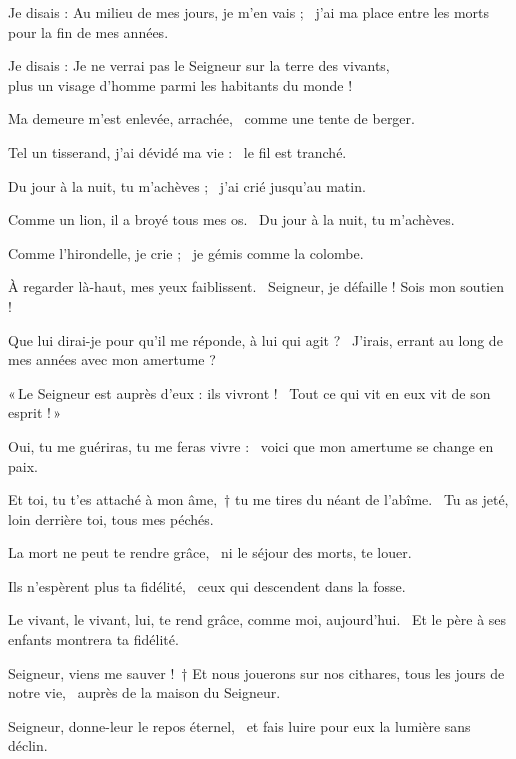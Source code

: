 \item Je disais : Au milieu de mes jours, je m’en vais ;~\psstar{} j’ai ma place entre les morts pour la fin de mes années.

\item Je disais : Je ne verrai pas le Seigneur sur la terre des vivants,~\psstar{}\\ plus un visage d’homme parmi les habitants du monde !

\item Ma demeure m’est enlevée, arrachée,~\psstar{} comme une tente de berger.

\item Tel un tisserand, j’ai dévidé ma vie :~\psstar{} le fil est tranché.

\item Du jour à la nuit, tu m’achèves ;~\psstar{} j’ai crié jusqu’au matin.

\item Comme un lion, il a broyé tous mes os.~\psstar{} Du jour à la nuit, tu m’achèves. 

\item Comme l’hirondelle, je crie ;~\psstar{} je gémis comme la colombe.

\item À regarder là-haut, mes yeux faiblissent.~\psstar{} Seigneur, je défaille ! Sois mon soutien !

\item Que lui dirai-je pour qu’il me réponde, à lui qui agit ?~\psstar{} J’irais, errant au long de mes années avec mon amertume ?

\item «\,Le Seigneur est auprès d’eux : ils vivront !~\psstar{} Tout ce qui vit en eux vit de son esprit !\,»

\item Oui, tu me guériras, tu me feras vivre :~\psstar{} voici que mon amertume se change en paix.

\item Et toi, tu t’es attaché à mon âme,~† tu me tires du néant de l’abîme.~\psstar{} Tu as jeté, loin derrière toi, tous mes péchés.

\item La mort ne peut te rendre grâce,~\psstar{} ni le séjour des morts, te louer.

\item Ils n’espèrent plus ta fidélité,~\psstar{} ceux qui descendent dans la fosse.

\item Le vivant, le vivant, lui, te rend grâce, comme moi, aujourd’hui.~\psstar{} Et le père à ses enfants montrera ta fidélité.

\item Seigneur, viens me sauver !~† Et nous jouerons sur nos cithares, tous les jours de notre vie,~\psstar{} auprès de la maison du Seigneur.

\item Seigneur, donne-leur le repos éternel,~\psstar{} et fais luire pour eux la lumière sans déclin.